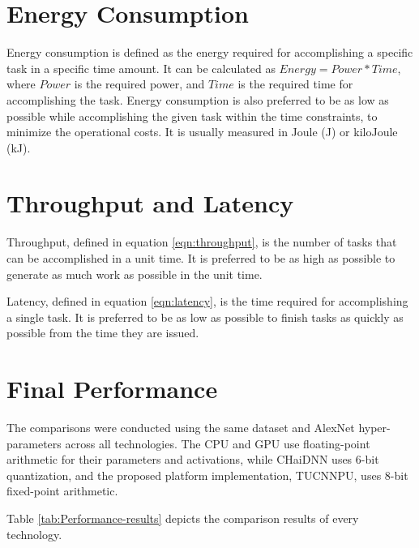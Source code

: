 \section{Energy Consumption}
Energy consumption is defined as the energy required for accomplishing a specific task in a specific time amount. It can be calculated as $Energy = Power * Time$, where $Power$ is the required power, and $Time$ is the required time for accomplishing the task. Energy consumption is also preferred to be as low as possible while accomplishing the given task within the time constraints, to minimize the operational costs. It is usually measured in Joule (J) or kiloJoule (kJ).

\section{Throughput and Latency}
Throughput, defined in equation \ref{eqn:throughput}, is the number of tasks that can be accomplished in a unit time. It is preferred to be as high as possible to generate as much work as possible in the unit time.

Latency, defined in equation \ref{eqn:latency}, is the time required for accomplishing a single task. It is preferred to be as low as possible to finish tasks as quickly as possible from the time they are issued.



\section{Final Performance}
The comparisons were conducted using the same dataset and AlexNet hyper-parameters across all technologies. The CPU and GPU use floating-point arithmetic for their parameters and activations, while CHaiDNN uses 6-bit quantization, and the proposed platform implementation, TUCNNPU, uses 8-bit fixed-point arithmetic.

Table \ref{tab:Performance-results} depicts the comparison results of every technology.

